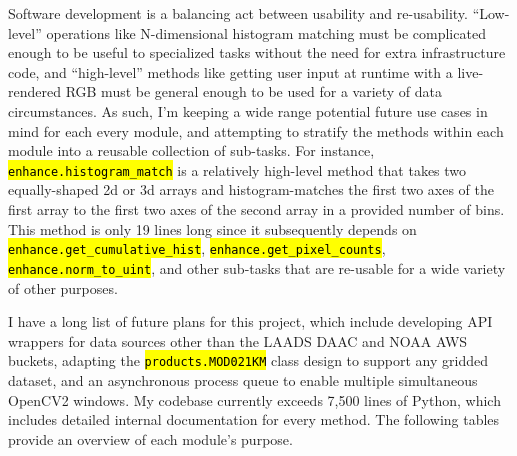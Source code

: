 \documentclass[12pt]{article}
\newcommand{\hltexttt}[1]{\texttt{\hl{#1}}}
\begin{document}
Software development is a balancing act between usability and re-usability. ``Low-level'' operations like N-dimensional histogram matching must be complicated enough to be useful to specialized tasks without the need for extra infrastructure code, and ``high-level'' methods like getting user input at runtime with a live-rendered RGB must be general enough to be used for a variety of data circumstances. As such, I'm keeping a wide range potential future use cases in mind for each every module, and attempting to stratify the methods within each module into a reusable collection of sub-tasks. For instance, \hltexttt{enhance.histogram\_match} is a relatively high-level method that takes two equally-shaped 2d or 3d arrays and histogram-matches the first two axes of the first array to the first two axes of the second array in a provided number of bins. This method is only 19 lines long since it subsequently depends on \hltexttt{enhance.get\_cumulative\_hist}, \hltexttt{enhance.get\_pixel\_counts}, \hltexttt{enhance.norm\_to\_uint}, and other sub-tasks that are re-usable for a wide variety of other purposes.

I have a long list of future plans for this project, which include developing API wrappers for data sources other than the LAADS DAAC and NOAA AWS buckets, adapting the \hltexttt{products.MOD021KM} class design to support any gridded dataset, and an asynchronous process queue to enable multiple simultaneous OpenCV2 windows. My codebase currently exceeds 7,500 lines of Python, which includes detailed internal documentation for every method. The following tables provide an overview of each module's purpose.
\end{document}
